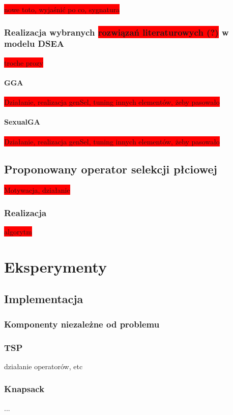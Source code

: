 \documentclass[twoside]{iisthesis}
\newcommand{\todo}{\colorbox{red}}
\begin{document}
\todo{nowe toto, wyjaśnić po co, sygnatura}

\subsection{Realizacja wybranych \todo{rozwiązań literaturowych (?)} w modelu DSEA}

\todo{troche prozy}

\subsubsection{GGA}

\todo{Działanie, realizacja genSel, tuning innych elementów, żeby pasowało}

\subsubsection{SexualGA}

\todo{Działanie, realizacja genSel, tuning innych elementów, żeby pasowało}

\section{Proponowany operator selekcji płciowej}

\todo{Motywacja, działanie}

\subsection{Realizacja}

\todo{algorytm}

\chapter{Eksperymenty}
\section{Implementacja}
\subsection{Komponenty niezależne od problemu}
\subsection{TSP}
działanie operatorów, etc
\subsection{Knapsack}
...
\end{document}
